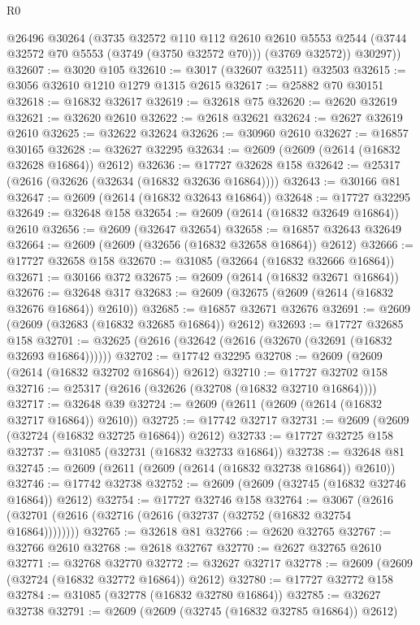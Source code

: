 \begin{lexlean}{R0}
\begin{coremodule}
        @26496
        @30264
        (@3735
          @32572
          @110
          @112
          @2610
          @2610
          @5553
          @2544
          (@3744 @32572 @70 @5553 (@3749 (@3750 @32572 @70)))
          (@3769 @32572))
        @30297))
@32607 := @3020 @105
@32610 := @3017 (@32607 @32511) @32503
@32615 := @3056 @32610 @1210 @1279 @1315 @2615
@32617 := @25882 @70 @30151
@32618 := @16832 @32617
@32619 := @32618 @75
@32620 := @2620 @32619
@32621 := @32620 @2610
@32622 := @2618 @32621
@32624 := @2627 @32619 @2610
@32625 := @32622 @32624
@32626 := @30960 @2610
@32627 := @16857 @30165
@32628 := @32627 @32295
@32634 := @2609 (@2609 (@2614 (@16832 @32628 @16864)) @2612)
@32636 := @17727 @32628 @158
@32642 := @25317 (@2616 (@32626 (@32634 (@16832 @32636 @16864))))
@32643 := @30166 @81
@32647 := @2609 (@2614 (@16832 @32643 @16864))
@32648 := @17727 @32295
@32649 := @32648 @158
@32654 := @2609 (@2614 (@16832 @32649 @16864)) @2610
@32656 := @2609 (@32647 @32654)
@32658 := @16857 @32643 @32649
@32664 := @2609 (@2609 (@32656 (@16832 @32658 @16864)) @2612)
@32666 := @17727 @32658 @158
@32670 := @31085 (@32664 (@16832 @32666 @16864))
@32671 := @30166 @372
@32675 := @2609 (@2614 (@16832 @32671 @16864))
@32676 := @32648 @317
@32683 := @2609 (@32675 (@2609 (@2614 (@16832 @32676 @16864)) @2610))
@32685 := @16857 @32671 @32676
@32691 := @2609 (@2609 (@32683 (@16832 @32685 @16864)) @2612)
@32693 := @17727 @32685 @158
@32701 := @32625 (@2616 (@32642 (@2616 (@32670 (@32691 (@16832 @32693 @16864))))))
@32702 := @17742 @32295
@32708 := @2609 (@2609 (@2614 (@16832 @32702 @16864)) @2612)
@32710 := @17727 @32702 @158
@32716 := @25317 (@2616 (@32626 (@32708 (@16832 @32710 @16864))))
@32717 := @32648 @39
@32724 := @2609 (@2611 (@2609 (@2614 (@16832 @32717 @16864)) @2610))
@32725 := @17742 @32717
@32731 := @2609 (@2609 (@32724 (@16832 @32725 @16864)) @2612)
@32733 := @17727 @32725 @158
@32737 := @31085 (@32731 (@16832 @32733 @16864))
@32738 := @32648 @81
@32745 := @2609 (@2611 (@2609 (@2614 (@16832 @32738 @16864)) @2610))
@32746 := @17742 @32738
@32752 := @2609 (@2609 (@32745 (@16832 @32746 @16864)) @2612)
@32754 := @17727 @32746 @158
@32764 := @3067 (@2616 (@32701 (@2616 (@32716 (@2616 (@32737 (@32752 (@16832 @32754 @16864))))))))
@32765 := @32618 @81
@32766 := @2620 @32765
@32767 := @32766 @2610
@32768 := @2618 @32767
@32770 := @2627 @32765 @2610
@32771 := @32768 @32770
@32772 := @32627 @32717
@32778 := @2609 (@2609 (@32724 (@16832 @32772 @16864)) @2612)
@32780 := @17727 @32772 @158
@32784 := @31085 (@32778 (@16832 @32780 @16864))
@32785 := @32627 @32738
@32791 := @2609 (@2609 (@32745 (@16832 @32785 @16864)) @2612)

\end{coremodule}
\end{lexlean}
